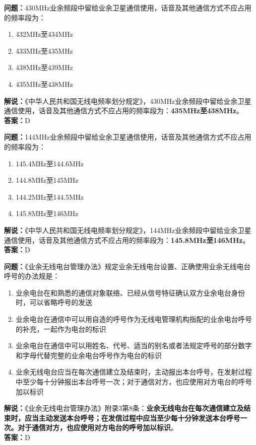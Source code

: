 \documentclass{ctexbook}
\begin{document}
\bigskip


\noindent\textbf{问题：}430MHz业余频段中留给业余卫星通信使用，话音及其他通信方式不应占用的频率段为：
\begin{enumerate}[label=\Alph*), leftmargin=3em]
	\item 432MHz至434MHz
	\item 433MHz至435MHz
	\item 438MHz至439MHz
	\item 435MHz至438MHz
\end{enumerate}
\noindent\textbf{解说：}《中华人民共和国无线电频率划分规定》，430MHz业余频段中留给业余卫星通信使用，话音及其他通信方式不应占用的频率段为：\textbf{435MHz至438MHz}。\\\noindent\textbf{答案：}D



\bigskip


\noindent\textbf{问题：}144MHz业余频段中留给业余卫星通信使用，话音及其他通信方式不应占用的频率段为：
\begin{enumerate}[label=\Alph*), leftmargin=3em]
	\item 145.4MHz至144.6MHz
	\item 144.8MHz至145MHz
	\item 144.2MHz至144.5MHz
	\item 145.8MHz至146MHz
\end{enumerate}
\noindent\textbf{解说：}《中华人民共和国无线电频率划分规定》，144MHz业余频段中留给业余卫星通信使用，话音及其他通信方式不应占用的频率段为：\textbf{145.8MHz至146MHz}。\\\noindent\textbf{答案：}D



\bigskip


\noindent\textbf{问题：}《业余无线电台管理办法》规定业余无线电台设置、正确使用业余无线电台呼号的办法规是：
\begin{enumerate}[label=\Alph*), leftmargin=3em]
	\item 业余电台在和熟悉的通信对象联络、已经从信号特征确认双方业余电台身份时，可以省略呼号的发送
	\item 业余电台在通信中可以用自造的呼号作为无线电管理机构指配的业余电台呼号的补充，一起作为电台的标识
	\item 业余电台在通信中可以用姓名、代号、适当的别名或者法规定呼号的部分数字和字母代替完整的业余电台呼号作为电台的标识
	\item 业余无线电台应当在每次通信建立及结束时，主动报出本台呼号，在发射过程中至少每十分钟报出本台呼号一次；对于通信对方，也应使用对方电台的呼号加以标识
\end{enumerate}
\noindent\textbf{解说：}《业余无线电台管理办法》附录3第8条：\textbf{业余无线电台在每次通信建立及结束时，应当主动发送本台呼号；在发信过程中应当至少每十分钟发送本台呼号一次。对于通信对方，也应使用对方电台的呼号加以标识}。\\\noindent\textbf{答案：}D
\end{document}
